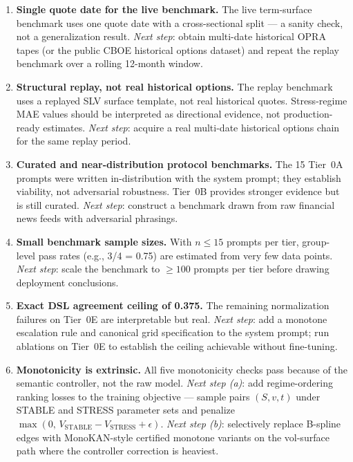\documentclass[11pt,a4paper]{article}
\begin{document}
\begin{enumerate}
  \item \textbf{Single quote date for the live benchmark.} The live term-surface benchmark
  uses one quote date with a cross-sectional split --- a sanity check, not a
  generalization result. \emph{Next step}: obtain multi-date historical OPRA tapes
  (or the public CBOE historical options dataset) and repeat the replay benchmark
  over a rolling 12-month window.

  \item \textbf{Structural replay, not real historical options.} The replay benchmark
  uses a replayed SLV surface template, not real historical quotes. Stress-regime MAE
  values should be interpreted as directional evidence, not production-ready estimates.
  \emph{Next step}: acquire a real multi-date historical options chain for the same
  replay period.

  \item \textbf{Curated and near-distribution protocol benchmarks.} The 15 Tier~0A
  prompts were written in-distribution with the system prompt; they establish viability,
  not adversarial robustness. Tier~0B provides stronger evidence but is still curated.
  \emph{Next step}: construct a benchmark drawn from raw financial news feeds with
  adversarial phrasings.

  \item \textbf{Small benchmark sample sizes.} With $n \leq 15$ prompts per tier,
  group-level pass rates (e.g., 3/4 = 0.75) are estimated from very few data points.
  \emph{Next step}: scale the benchmark to $\geq 100$ prompts per tier before drawing
  deployment conclusions.

  \item \textbf{Exact DSL agreement ceiling of 0.375.} The remaining normalization
  failures on Tier~0E are interpretable but real. \emph{Next step}: add a monotone
  escalation rule and canonical grid specification to the system prompt; run ablations
  on Tier~0E to establish the ceiling achievable without fine-tuning.

  \item \textbf{Monotonicity is extrinsic.} All five monotonicity checks pass because
  of the semantic controller, not the raw model. \emph{Next step (a)}: add
  regime-ordering ranking losses to the training objective --- sample pairs $(S,v,t)$
  under STABLE and STRESS parameter sets and penalize $\max(0,\, V_\text{STABLE} -
  V_\text{STRESS} + \epsilon)$. \emph{Next step (b)}: selectively replace B-spline
  edges with MonoKAN-style certified monotone variants \citep{polo_molina_etal_2024_monokan}
  on the vol-surface path where the controller correction is heaviest.


\end{enumerate}
\end{document}
